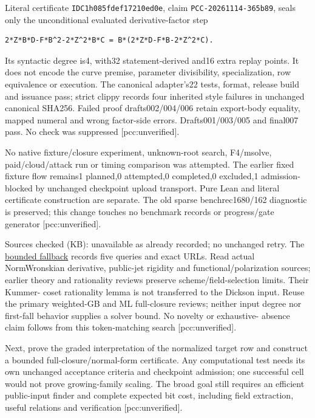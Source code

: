 \documentclass[
  10pt,
]{article}
\begin{document}
Literal certificate \texttt{IDC1h085fdef17210ed0e}, claim
\texttt{PCC-20261114-365b89}, seals only the unconditional evaluated
derivative-factor step

\begin{verbatim}
2*Z*B*D-F*B^2-2*Z^2*B*C = B*(2*Z*D-F*B-2*Z^2*C).
\end{verbatim}

Its syntactic degree is4, with32 statement-derived and16 extra replay
points. It does not encode the curve premise, parameter divisibility,
specialization, row equivalence or execution. The canonical adapter's22
tests, format, release build and issuance pass; strict clippy records
four inherited style failures in unchanged canonical SHA256. Failed
proof drafts002/004/006 retain export-body equality, mapped numeral and
wrong factor-side errors. Drafts001/003/005 and final007 pass. No check
was suppressed {[}pcc:unverified{]}.

No native fixture/closure experiment, unknown-root search, F4/msolve,
paid/cloud/attack run or timing comparison was attempted. The earlier
fixed fixture flow remains1 planned,0 attempted,0 completed,0 excluded,1
admission- blocked by unchanged checkpoint upload transport. Pure Lean
and literal certificate construction are separate. The old sparse
benchrec1680/162 diagnostic is preserved; this change touches no
benchmark records or progress/gate generator {[}pcc:unverified{]}.

Sources checked (KB): unavailable as already recorded; no unchanged
retry. The
\href{../target-fiber-evidence/prior-search-receipt.json}{bounded
fallback} records five queries and exact URLs. Read actual NormWronskian
derivative, public-jet rigidity and functional/polarization sources;
earlier theory and rationality reviews preserve scheme/field-selection
limits. Their Kummer- coset rationality lemma is not transferred to the
Dickson input. Reuse the primary weighted-GB and ML full-closure
reviews; neither input degree nor first-fall behavior supplies a solver
bound. No novelty or exhaustive- absence claim follows from this
token-matching search {[}pcc:unverified{]}.

Next, prove the graded interpretation of the normalized target row and
construct a bounded full-closure/normal-form certificate. Any
computational test needs its own unchanged acceptance criteria and
checkpoint admission; one successful cell would not prove growing-family
scaling. The broad goal still requires an efficient public-input finder
and complete expected bit cost, including field extraction, useful
relations and verification {[}pcc:unverified{]}.
\end{document}
